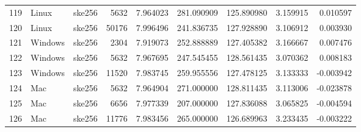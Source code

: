 \documentclass{IEEEtran}
\begin{document}
\begin{longtable}{rllrrrrrr}
  119 & Linux & ske256 &    5632 & 7.964023 & 281.090909 & 125.890980 & 3.159915 & 0.010597 \\ 
  120 & Linux & ske256 &   50176 & 7.996496 & 241.836735 & 127.928890 & 3.106912 & 0.003930 \\ 
  121 & Windows & ske256 &    2304 & 7.919073 & 252.888889 & 127.405382 & 3.166667 & 0.007476 \\ 
  122 & Windows & ske256 &    5632 & 7.967695 & 247.545455 & 128.561435 & 3.070362 & 0.008183 \\ 
  123 & Windows & ske256 &   11520 & 7.983745 & 259.955556 & 127.478125 & 3.133333 & -0.003942 \\ 
  124 & Mac & ske256 &    5632 & 7.964904 & 271.000000 & 128.811435 & 3.113006 & -0.023878 \\ 
  125 & Mac & ske256 &    6656 & 7.977339 & 207.000000 & 127.836088 & 3.065825 & -0.004594 \\ 
  126 & Mac & ske256 &   11776 & 7.983456 & 265.000000 & 126.689963 & 3.233435 & -0.003222 \\ 
  \hline
\end{longtable}
\end{document}

